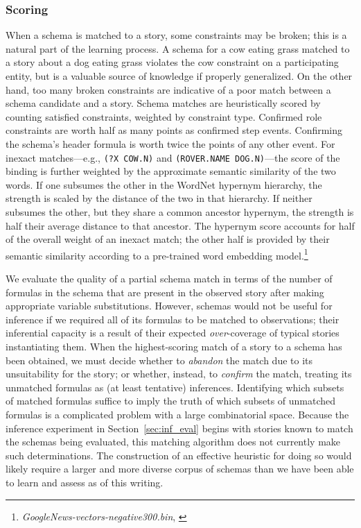 \subsubsection{Scoring}
When a schema is matched to a story, some constraints may be broken; this is a natural part of the learning process. A schema for a cow eating grass matched to a story about a dog eating grass violates the cow constraint on a participating entity, but is a valuable source of knowledge if properly generalized. On the other hand, too many broken constraints are indicative of a poor match between a schema candidate and a story.
Schema matches are heuristically scored by counting satisfied constraints, weighted by constraint type.
Confirmed role constraints are worth half as many points as confirmed step events.
Confirming the schema's header formula is worth twice the points of any other event.
For inexact matches---e.g., \texttt{(?X COW.N)} and \texttt{(ROVER.NAME DOG.N)}---the score of the binding is further weighted by the approximate semantic similarity of the two words. If one subsumes the other in the WordNet hypernym hierarchy, the strength is scaled by the distance of the two in that hierarchy. If neither subsumes the other, but they share a common ancestor hypernym, the strength is half their average distance to that ancestor.
The hypernym score accounts for half of the overall weight of an inexact match; the other half is provided by their semantic similarity according to a pre-trained word embedding model.\footnote{\textit{GoogleNews-vectors-negative300.bin}, \citet{NIPS2013_5021}}

We evaluate the quality of a partial schema match in terms of the number of formulas in the schema that are present in the observed story after making appropriate variable substitutions. However, schemas would not be useful for inference if we required all of its formulas to be matched to observations; their inferential capacity is a result of their expected \textit{over}-coverage of typical stories instantiating them. When the highest-scoring match of a story to a schema has been obtained, we must decide whether to \textit{abandon} the match due to its unsuitability for the story; or whether, instead, to \textit{confirm} the match, treating its unmatched formulas as (at least tentative) inferences. Identifying which subsets of matched formulas suffice to imply the truth of which subsets of unmatched formulas is a complicated problem with a large combinatorial space. Because the inference experiment in Section~\ref{sec:inf_eval} begins with stories known to match the schemas being evaluated, this matching algorithm does not currently make such determinations. The construction of an effective heuristic for doing so would likely require a larger and more diverse corpus of schemas than we have been able to learn and assess as of this writing.

